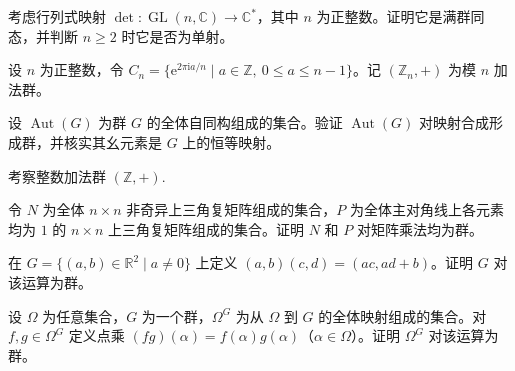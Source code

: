 \noindent\begin{minipage}{\textwidth}
考虑行列式映射 $\det\colon\operatorname{GL}(n,\mathbb{C})\to\mathbb{C}^{*}$，其中 $n$ 为正整数。证明它是满群同态，并判断 $n\geq 2$ 时它是否为单射。
\end{minipage}\par\vfill
\newpage
\noindent\begin{minipage}{\textwidth}
设 $n$ 为正整数，令 $C_n=\{\mathrm{e}^{2\pi\mathrm{i}a/n}\mid a\in\mathbb{Z},\ 0\leq a\leq n-1\}$。记 $(\mathbb{Z}_n,+)$ 为模 $n$ 加法群。
\end{minipage}\par\vfill
\noindent\begin{minipage}{\textwidth}
设 $\operatorname{Aut}(G)$ 为群 $G$ 的全体自同构组成的集合。验证 $\operatorname{Aut}(G)$ 对映射合成形成群，并核实其幺元素是 $G$ 上的恒等映射。
\end{minipage}\par\vfill
\noindent\begin{minipage}{\textwidth}
考察整数加法群 $(\mathbb{Z},+)$.
\end{minipage}\par\vfill
\newpage
\noindent\begin{minipage}{\textwidth}
令 $N$ 为全体 $n\times n$ 非奇异上三角复矩阵组成的集合，$P$ 为全体主对角线上各元素均为 $1$ 的 $n\times n$ 上三角复矩阵组成的集合。证明 $N$ 和 $P$ 对矩阵乘法均为群。
\end{minipage}\par\vfill
\noindent\begin{minipage}{\textwidth}
在 $G=\{(a,b)\in\mathbb{R}^{2}\mid a\ne0\}$ 上定义 $(a,b)(c,d)=(ac,ad+b)$。证明 $G$ 对该运算为群。
\end{minipage}\par\vfill
\noindent\begin{minipage}{\textwidth}
设 $\Omega$ 为任意集合，$G$ 为一个群，$\Omega^G$ 为从 $\Omega$ 到 $G$ 的全体映射组成的集合。对 $f,g\in\Omega^G$ 定义点乘 $(fg)(\alpha)=f(\alpha)g(\alpha)$（$\alpha\in\Omega$）。证明 $\Omega^G$ 对该运算为群。
\end{minipage}\par\vfill
